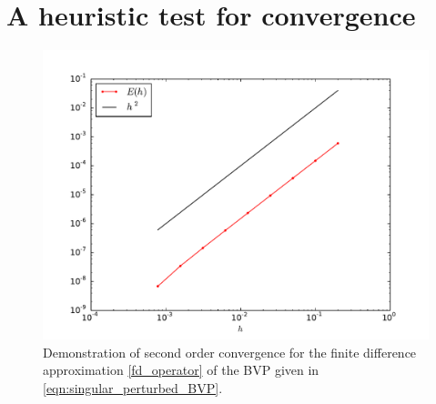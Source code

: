 \section*{A heuristic test for convergence}
\begin{figure}[ht]
\centering
\includegraphics[width=12cm]{example_convergence.pdf}
\caption{Demonstration of second order convergence for the finite difference approximation \eqref{fd_operator} of the BVP given in \eqref{eqn:singular_perturbed_BVP}.} \label{fig:finitedifference2}
\end{figure}

